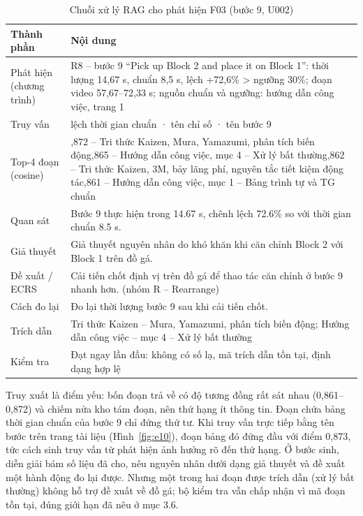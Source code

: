 \begin{table}[H]
\centering
\caption{Chuỗi xử lý RAG cho phát hiện F03 (bước 9, U002)}\label{tab:e5}
\footnotesize
\setlength{\tabcolsep}{3pt}\renewcommand{\arraystretch}{1.15}
\begin{tabular}{@{}>{\raggedright\arraybackslash}p{}>{\raggedright\arraybackslash}p{}@{}}
\toprule
\textbf{Thành phần} & \textbf{Nội dung} \\\midrule
Phát hiện (chương trình) & R8 – bước 9 “Pick up Block 2 and place it on Block 1”: thời lượng 14,67 s, chuẩn 8,5 s, lệch +72,6\% > ngưỡng 30\%; đoạn video 57,67–72,33 s; nguồn chuẩn và ngưỡng: hướng dẫn công việc, trang 1 \\
Truy vấn & lệch thời gian chuẩn · tên chỉ số · tên bước 9 \\
Top-4 đoạn (cosine) & 0,872 – Tri thức Kaizen, Mura, Yamazumi, phân tích biến động\newline 0,865 – Hướng dẫn công việc, mục 4 – Xử lý bất thường\newline 0,862 – Tri thức Kaizen, 3M, bảy lãng phí, nguyên tắc tiết kiệm động tác\newline 0,861 – Hướng dẫn công việc, mục 1 – Bảng trình tự và TG chuẩn \\
Quan sát & Bước 9 thực hiện trong 14.67 s, chênh lệch 72.6\% so với thời gian chuẩn 8.5 s. \\
Giả thuyết & Giả thuyết nguyên nhân do khó khăn khi căn chỉnh Block 2 với Block 1 trên đồ gá. \\
Đề xuất / ECRS & Cải tiến chốt định vị trên đồ gá để thao tác căn chỉnh ở bước 9 nhanh hơn. (nhóm R – Rearrange) \\
Cách đo lại & Đo lại thời lượng bước 9 sau khi cải tiến chốt. \\
Trích dẫn & Tri thức Kaizen – Mura, Yamazumi, phân tích biến động; Hướng dẫn công việc – mục 4 – Xử lý bất thường \\
Kiểm tra & Đạt ngay lần đầu: không có số lạ, mã trích dẫn tồn tại, định dạng hợp lệ \\
\bottomrule
\end{tabular}
\end{table}

Truy xuất là điểm yếu: bốn đoạn trả về có độ tương đồng rất sát nhau (0,861–0,872) và chiếm nửa kho tám đoạn, nên thứ hạng ít thông tin. Đoạn chứa bảng thời gian chuẩn của bước 9 chỉ đứng thứ tư. Khi truy vấn trực tiếp bằng tên bước trên trang tài liệu (Hình~\ref{fig:e10}), đoạn bảng đó đứng đầu với điểm 0,873, tức cách sinh truy vấn từ phát hiện ảnh hưởng rõ đến thứ hạng. Ở bước sinh, diễn giải bám số liệu đã cho, nêu nguyên nhân dưới dạng giả thuyết và đề xuất một hành động đo lại được. Nhưng một trong hai đoạn được trích dẫn (xử lý bất thường) không hỗ trợ đề xuất về đồ gá; bộ kiểm tra vẫn chấp nhận vì mã đoạn tồn tại, đúng giới hạn đã nêu ở mục 3.6.

